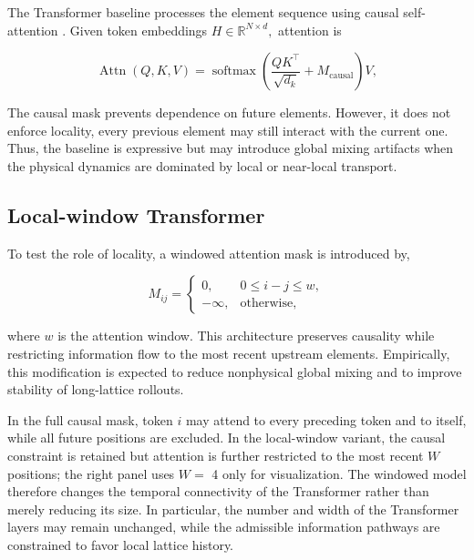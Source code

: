 The Transformer baseline processes the element sequence using causal self-attention \cite{vaswani2017attention}. Given token embeddings \(H \in \mathbb{R}^{N \times d} ,\) attention is

\begin{equation}
\label{eq:153}
\operatorname{Attn}(Q,K,V)=\operatorname{softmax}\left(\frac{QK^{\top}}{\sqrt{d_k}}+M_{\mathrm{causal}}\right)V,
\end{equation}

The causal mask prevents dependence on future elements. However, it does not enforce locality, every previous element may still interact with the current one. Thus, the baseline is expressive but may introduce global mixing artifacts when the physical dynamics are dominated by local or near-local transport.

\subsection{Local-window Transformer}
\label{sec:04_machine_learning_methodology_local_window_transformer}

To test the role of locality, a windowed attention mask is introduced by,

\begin{equation}
\label{eq:154}
M_{ij}=\begin{cases}0,&0\le i-j\le w,\\-\infty,&\text{otherwise},\end{cases}
\end{equation}

where \(w\) is the attention window. This architecture preserves causality while restricting information flow to the most recent upstream elements. Empirically, this modification is expected to reduce nonphysical global mixing and to improve stability of long-lattice rollouts.

In the full causal mask, token \(i\) may attend to every preceding token and to itself, while all future positions are excluded. In the local-window variant, the causal constraint is retained but attention is further restricted to the most recent \(W\) positions; the right panel uses \(W =\) 4 only for visualization. The windowed model therefore changes the temporal connectivity of the Transformer rather than merely reducing its size. In particular, the number and width of the Transformer layers may remain unchanged, while the admissible information pathways are constrained to favor local lattice history.

